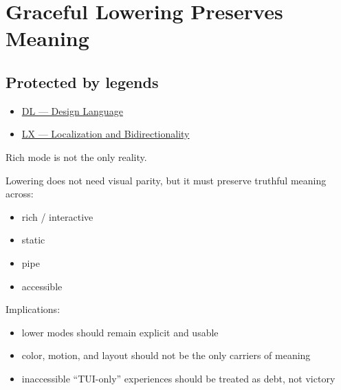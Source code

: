 \chapter{Graceful Lowering Preserves Meaning}\label{record-045}

\smallskip

\section{Protected by legends}\label{record-045-protected-by-legends}

\begin{itemize}
\tightlist
\item
  \href{https://github.com/flyingrobots/bijou/blob/1853ad902f6bf219326409e7f743a5a1d6517dbc/docs/legends/DL-design-language.md}{DL --- Design Language}
\item
  \href{https://github.com/flyingrobots/bijou/blob/1853ad902f6bf219326409e7f743a5a1d6517dbc/docs/legends/LX-localization-and-bidirectionality.md}{LX --- Localization and Bidirectionality}
\end{itemize}

Rich mode is not the only reality.

Lowering does not need visual parity, but it must preserve truthful meaning across:

\begin{itemize}
\tightlist
\item
  rich / interactive
\item
  static
\item
  pipe
\item
  accessible
\end{itemize}

Implications:

\begin{itemize}
\tightlist
\item
  lower modes should remain explicit and usable
\item
  color, motion, and layout should not be the only carriers of meaning
\item
  inaccessible ``TUI-only'' experiences should be treated as debt, not victory
\end{itemize}

